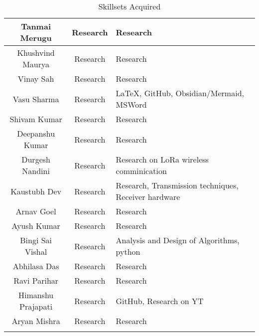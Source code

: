 \begin{center}
\begin{longtable}{ | c | c | m{6cm} | }
        \hline 
        Tanmai Merugu & Research & Research\\ 
        \hline 
        Khushvind Maurya & Research & Research\\ 
        \hline 
        Vinay Sah & Research & Research\\ 
        \hline 
        Vasu Sharma & Research & LaTeX, GitHub, Obsidian/Mermaid, MSWord\\ 
        \hline 
        Shivam Kumar & Research & Research\\ 
        \hline 
        Deepanshu Kumar & Research & Research\\ 
        \hline 
        Durgesh Nandini & Research & Research on LoRa wireless comminication\\ 
        \hline 
        Kaustubh Dev & Research & Research, Transmission techniques, Receiver hardware\\ 
        \hline 
        Arnav Goel & Research & Research\\ 
        \hline 
        Ayush Kumar & Research & Research\\ 
        \hline 
        Bingi Sai Vishal & Research & Analysis and Design of Algorithms, python\\ 
        \hline 
        Abhilasa Das & Research & Research\\ 
        \hline 
        Ravi Parihar & Research & Research\\ 
        \hline 
        Himanshu Prajapati & Research & GitHub, Research on YT\\ 
        \hline 
        Aryan Mishra & Research & Research\\ 
        \hline 

        \hline
        \caption{Skillsets Acquired}
    \end{longtable}
\end{center}

\newpage
